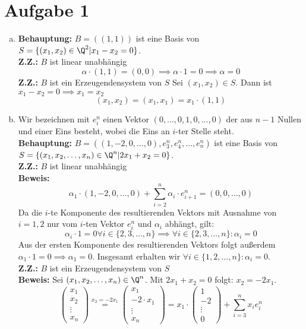 \documentclass{article}
\begin{document}
	\section*{Aufgabe 1}
	\begin{enumerate}[(a)]
		\item \textbf{Behauptung:} $B = ((1,1))$ ist eine Basis von $S = \{(x_1,x_2)\in \Q^2|x_1-x_2 = 0\}$.\\
			\textbf{Z.Z.:} $B$ ist linear unabhängig
			\[\alpha \cdot (1,1) = (0,0) \implies \alpha \cdot 1 = 0\implies \alpha = 0\]
			\textbf{Z.Z.:} $B$ ist ein Erzeugendensystem von $S$
			Sei $(x_1,x_2)\in S$. Dann ist $x_1-x_2 = 0\implies x_1 = x_2$
			\[(x_1, x_2) = (x_1, x_1) = x_1\cdot (1,1)\]
		\item Wir bezeichnen mit $e_i^n$ einen Vektor $(0,\dots,0,1,0,\dots,0)$
			der aus $n-1$ Nullen und einer Eins besteht, wobei die Eins an $i$-ter Stelle steht.\\
			\textbf{Behauptung:} $B = ((1,-2,0,\dots,0), e_3^n, e_4^n, \dots, e_n^n)$
			ist eine Basis von $S = \{(x_1 , x_2 , \dots , x_n ) \in \Q^n | 2x_1 + x_2 = 0\}$.\\ 
			\textbf{Z.Z.:} $B$ ist linear unabhängig\\
			\textbf{Beweis:}
			\[\alpha_1 \cdot  (1,-2,0,\dots,0) + \sum_{i=2}^{n}\alpha_i\cdot e_{i+1}^n =  (0,0,\dots, 0)\] 
			Da die $i$-te Komponente des resultierenden Vektors mit Ausnahme von $i=1,2$ nur vom $i$-ten Vektor $e_i^n$  und $\alpha_i$ abhängt, gilt:
			\[\alpha_i \cdot 1 = 0\forall i\in \{2,3,\dots, n\} \implies \forall i\in \{2,3,\dots, n\}:\alpha_i = 0\]
			Aus der ersten Komponente des resultierenden Vektors folgt außerdem $\alpha_1 \cdot 1 = 0 \implies \alpha_1 = 0$.
			Insgesamt erhalten wir $\forall i\in \{1,2,\dots, n\}: \alpha_i = 0$.\\ 
			\textbf{Z.Z.:} $B$ ist ein Erzeugendensystem von $S$\\
			\textbf{Beweis:}
			Sei $(x_1, x_2, \dots, x_n)\in \Q^n$. Mit $2x_1 + x_2= 0$ folgt: $x_2 = -2x_1$.
			\[\begin{pmatrix}x_1\\x_2\\\vdots\\x_n\end{pmatrix} \overset{x_2 = -2x_1}{=} \begin{pmatrix}x_1\\-2\cdot x_1\\\vdots\\x_n\end{pmatrix}= x_1\cdot\begin{pmatrix}1\\-2\\\vdots\\0\end{pmatrix} + \sum_{i=3}^n x_i e_{i}^n\]

\end{enumerate}
\end{document}

